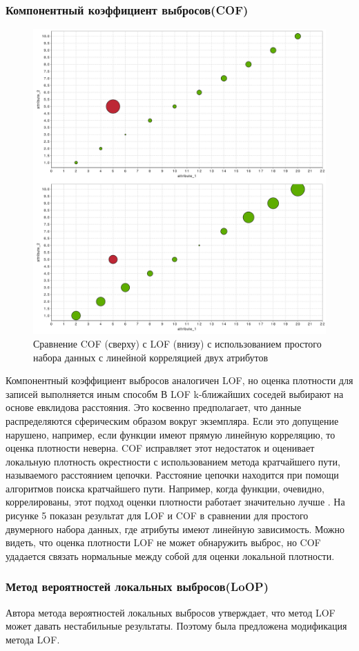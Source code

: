  \subsubsection{Компонентный коэффициент выбросов(COF)}
 \begin{figure}[h!]
 	\centering
 	\includegraphics[width=.5\textwidth]{img/5_3rdpart.png}
 	\caption{Сравнение COF (сверху) с LOF (внизу) с использованием простого набора данных с линейной корреляцией двух атрибутов}
 	\label{fig05}
 \end{figure}
 Компонентный коэффициент выбросов аналогичен LOF, но оценка плотности для записей выполняется иным способм В LOF k-ближайших соседей выбирают на основе евклидова расстояния. Это косвенно предполагает, что данные распределяются сферическим образом вокруг экземпляра. Если это допущение нарушено, например, если функции имеют прямую линейную корреляцию, то оценка плотности неверна. COF исправляет этот недостаток и оценивает локальную плотность окрестности с использованием метода кратчайшего пути, называемого расстоянием цепочки. Расстояние цепочки находится при помощи алгоритмов поиска кратчайшего пути. Например, когда функции, очевидно, коррелированы, этот подход оценки плотности работает значительно лучше \cite{Book14}. 
 На рисунке 5 показан результат для LOF и COF в сравнении для простого двумерного набора данных, где атрибуты имеют линейную зависимость. Можно видеть, что оценка  плотности LOF не может обнаружить выброс, но COF удадается связать  нормальные между собой для оценки локальной плотности.
 \subsubsection{Метод вероятностей локальных выбросов(LoOP)}
 Автора метода вероятностей локальных выбросов утверждает, что метод LOF может давать нестабильные  результаты\cite{Book18}. Поэтому была предложена модификация метода LOF.
 
